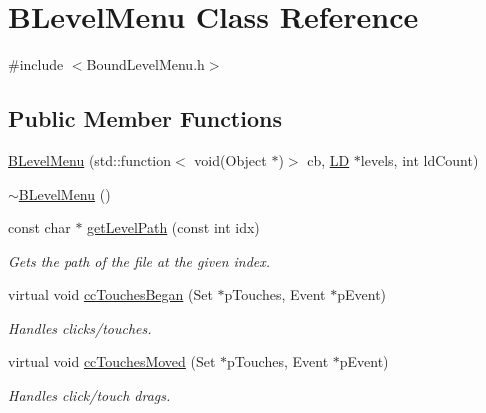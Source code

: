 \hypertarget{class_b_level_menu}{\section{\-B\-Level\-Menu \-Class \-Reference}
\label{class_b_level_menu}
}


{\ttfamily \#include $<$\-Bound\-Level\-Menu.\-h$>$}

\subsection*{\-Public \-Member \-Functions}
\begin{DoxyCompactItemize}
\item 
\hyperlink{class_b_level_menu_a69ba640ac24dc36f82a5fe62a0036f52}{\-B\-Level\-Menu} (std\-::function$<$ void(\-Object $\ast$)$>$ cb, \hyperlink{struct_l_d}{\-L\-D} $\ast$levels, int ld\-Count)
\item 
\hyperlink{class_b_level_menu_a4646279f37990d842a77eb2e071a3919}{$\sim$\-B\-Level\-Menu} ()
\item 
const char $\ast$ \hyperlink{class_b_level_menu_a38bfb874e8a2d32bb01f4a281032e84c}{get\-Level\-Path} (const int idx)
\begin{DoxyCompactList}\small\item\em \-Gets the path of the file at the given index. \end{DoxyCompactList}\item 
virtual void \hyperlink{class_b_level_menu_a3a7207f8b357ae3e82b26b3507137775}{cc\-Touches\-Began} (\-Set $\ast$p\-Touches, \-Event $\ast$p\-Event)
\begin{DoxyCompactList}\small\item\em \-Handles clicks/touches. \end{DoxyCompactList}\item 
virtual void \hyperlink{class_b_level_menu_a14fc166131531c3c9ef271eb965bfd64}{cc\-Touches\-Moved} (\-Set $\ast$p\-Touches, \-Event $\ast$p\-Event)
\begin{DoxyCompactList}\small\item\em \-Handles click/touch drags. \end{DoxyCompactList}\end{DoxyCompactItemize}


